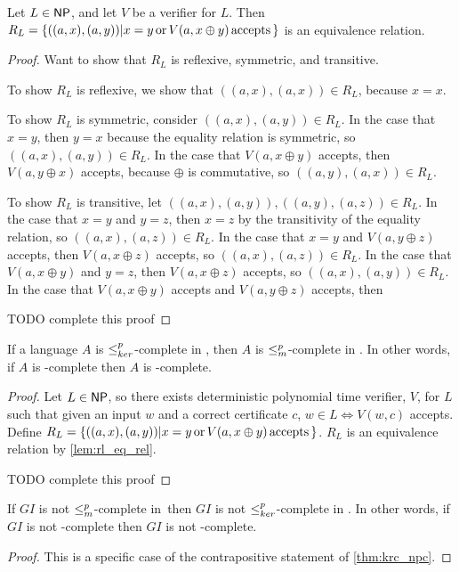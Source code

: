 \begin{lemma}\label{lem:rl_eq_rel}Let $L\in{\ensuremath{\mathsf{NP}}}$, and let $V$ be a verifier for
  $L$. Then $R_L=\{((a,x),(a,y))|x=y\,\text{or}\,V(a,x\oplus y)\,\text{accepts}\,\}$
  is an equivalence relation.\end{lemma}
\begin{proof}Want to show that $R_L$ is reflexive, symmetric, and transitive.
  
  To show $R_L$ is reflexive, we show that $((a,x),(a,x))\in R_L$, because
  $x=x$.

  To show $R_L$ is symmetric, consider $((a,x),(a,y))\in R_L$. In the case that
  $x=y$, then $y=x$ because the equality relation is symmetric, so
  $((a,x),(a,y))\in R_L$. In the case that $V(a,x\oplus y)$ accepts, then
  $V(a,y\oplus x)$ accepts, because $\oplus$ is commutative, so
  $((a,y),(a,x))\in R_L$.

  To show $R_L$ is transitive, let $((a,x),(a,y)),((a,y),(a,z))\in R_L$. In the
  case that $x=y$ and $y=z$, then $x=z$ by the transitivity of the equality
  relation, so $((a,x),(a,z))\in R_L$. In the case that $x=y$ and $V(a, y\oplus
  z)$ accepts, then $V(a, x\oplus z)$ accepts, so $((a,x),(a,z))\in R_L$. In
  the case that $V(a, x\oplus y)$ and $y=z$, then $V(a, x\oplus z)$ accepts, so
  $((a,x), (a,y))\in R_L$. In the case that $V(a, x\oplus y)$ accepts and $V(a,
  y\oplus z)$ accepts, then 

  TODO complete this proof
\end{proof}

\begin{theorem}\label{thm:krc_npc}If a language $A$ is $\leq^{p}_{ker}$-complete in \NPEq,
  then $A$ is $\leq^{p}_{m}$-complete in \NP. In other words, if $A$ is \NPEq-complete
  then $A$ is \NP-complete.\end{theorem}
\begin{proof}
  Let $L\in{\ensuremath{\mathsf{NP}}}$, so there exists deterministic polynomial time verifier, $V$,
  for $L$ such that given an input $w$ and a correct certificate $c$, $w\in
  L\iff V(w,c)$ accepts. Define $R_L=\{((a, x),(a, y))|x=y \,\text{or}\, V(a,
  x\oplus y) \,\text{accepts}\,\}$. $R_L$ is an equivalence relation by
  \autoref{lem:rl_eq_rel}.

  TODO complete this proof
\end{proof}

\begin{corollary}\label{cor:gi_complete}If $GI$ is not $\leq^{p}_{m}$-complete in
  \NP\,then $GI$ is not $\leq^{p}_{ker}$-complete in \NPEq. In other words, if $GI$ is not
  \NP-complete then $GI$ is not \NPEq-complete.\end{corollary}
\begin{proof}
  This is a specific case of the contrapositive statement of
  \autoref{thm:krc_npc}.
\end{proof}

